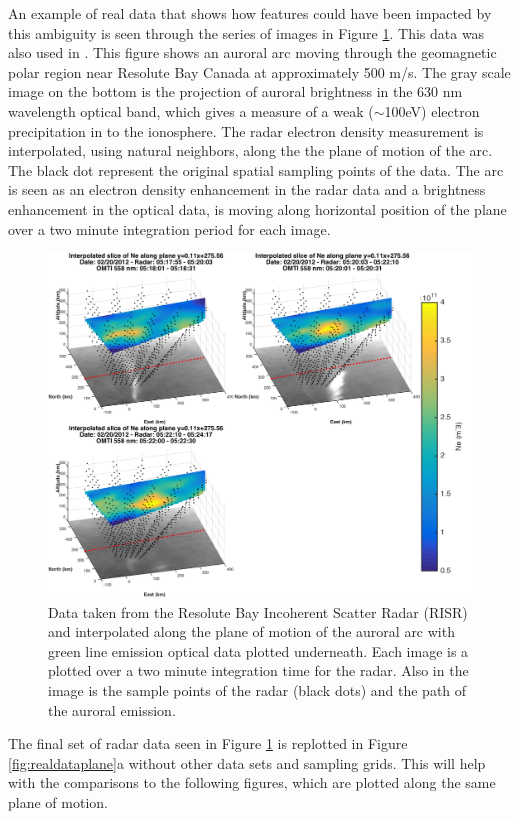 An example of real data that shows how features could have been impacted by this ambiguity is seen through the series of images in Figure \ref{fig:realdataplane3points}. This data was also used in \cite{Perry:2015jf}. This figure shows an auroral arc moving through the geomagnetic polar region near Resolute Bay Canada at approximately 500 m/s. The gray scale image on the bottom is the projection of auroral brightness in the 630 nm wavelength optical band, which gives a measure of a weak ($\sim$100eV) electron precipitation in to the ionosphere. The radar electron density measurement is interpolated, using natural neighbors, along the the plane of motion of the arc. The black dot represent the original spatial sampling points of the data. The arc is seen as an electron density enhancement in the radar data and a brightness enhancement in the optical data, is moving along horizontal position of the plane over a two minute integration period for each image. 

\begin{figure}[htb]
	\centering
	\includegraphics[width=5in]{radarwithoptical}
	\caption{Data taken from the Resolute Bay Incoherent Scatter Radar (RISR) and interpolated along the plane of motion of the auroral arc with green line emission optical data plotted underneath. Each image is a plotted over a two minute integration time for the radar. Also in the image is the sample points of the radar (black dots) and the path of the auroral emission. }
	\label{fig:realdataplane3points}
\end{figure}

The final set of radar data seen in Figure \ref{fig:realdataplane3points} is replotted in Figure \ref{fig:realdataplane}a without other data sets and sampling grids. This will help with the comparisons to the following figures, which are plotted along the same plane of motion.

